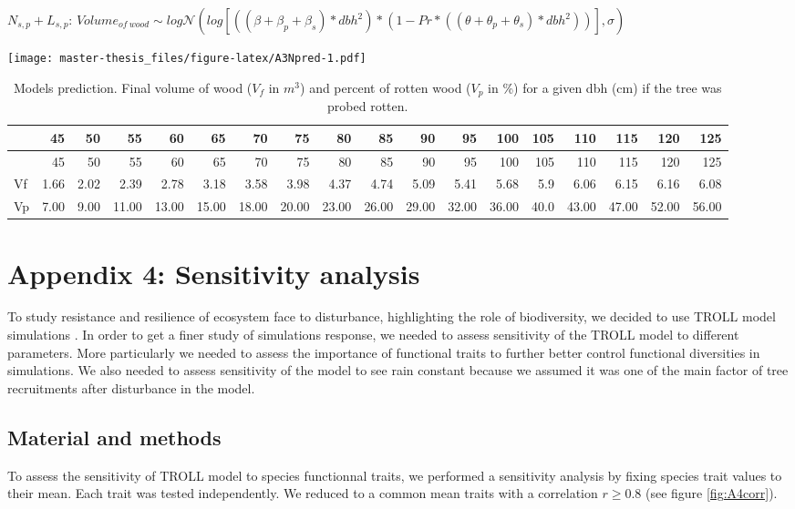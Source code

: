 \documentclass[12pt,]{article}
\let\oldsection\section
\renewcommand\section{\newpage\oldsection}
\theoremstyle{definition}
\theoremstyle{definition}
\theoremstyle{remark}
\begin{document}
\(N_{s,p} + L_{s,p}\):
\(Volume_{of~wood} \sim log\mathcal{N} (log[((\beta + \beta_p + \beta_s)*dbh^2)*(1 - Pr*((\theta + \theta_p + \theta_s) *dbh^2))], \sigma)\)

\texttt{[image: master-thesis\_files/figure-latex/A3Npred-1.pdf]}

\begin{longtable}[]{@{}lrrrrrrrrrrrrrrrrr@{}}
\caption{\label{tab:A3Ntab}Models prediction. Final volume of wood (\(V_f\)
in \(m^3\)) and percent of rotten wood (\(V_p\) in \%) for a given dbh
(cm) if the tree was probed rotten.}\tabularnewline
\toprule
& 45 & 50 & 55 & 60 & 65 & 70 & 75 & 80 & 85 & 90 & 95 & 100 & 105 & 110
& 115 & 120 & 125\tabularnewline
\midrule
\endfirsthead
\toprule
& 45 & 50 & 55 & 60 & 65 & 70 & 75 & 80 & 85 & 90 & 95 & 100 & 105 & 110
& 115 & 120 & 125\tabularnewline
\midrule
\endhead
Vf & 1.66 & 2.02 & 2.39 & 2.78 & 3.18 & 3.58 & 3.98 & 4.37 & 4.74 & 5.09
& 5.41 & 5.68 & 5.9 & 6.06 & 6.15 & 6.16 & 6.08\tabularnewline
Vp & 7.00 & 9.00 & 11.00 & 13.00 & 15.00 & 18.00 & 20.00 & 23.00 & 26.00
& 29.00 & 32.00 & 36.00 & 40.0 & 43.00 & 47.00 & 52.00 &
56.00\tabularnewline
\bottomrule
\end{longtable}

\hypertarget{appendix-4-sensitivity-analysis}{\section{Appendix 4:
Sensitivity analysis}\label{appendix-4-sensitivity-analysis}}

To study resistance and resilience of ecosystem face to disturbance,
highlighting the role of biodiversity, we decided to use TROLL model
simulations \citep{Chave1999}. In order to get a finer study of
simulations response, we needed to assess sensitivity of the TROLL model
to different parameters. More particularly we needed to assess the
importance of functional traits to further better control functional
diversities in simulations. We also needed to assess sensitivity of the
model to see rain constant because we assumed it was one of the main
factor of tree recruitments after disturbance in the model.

\subsection{Material and methods}\label{material-and-methods-2}

To assess the sensitivity of TROLL model to species functionnal traits,
we performed a sensitivity analysis by fixing species trait values to
their mean. Each trait was tested independently. We reduced to a common
mean traits with a correlation \(r \geq 0.8\) (see figure
\ref{fig:A4corr}).
\end{document}
